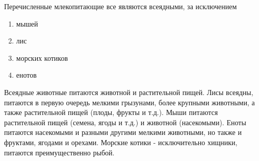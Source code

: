 
Перечисленные млекопитающие все являются всеядными, за исключением

\begin{enumerate}
    \item мышей
    \item лис
    \item морских котиков
    \item енотов
\end{enumerate}

\explanationSection

Всеядные животные питаются животной и растительной пищей. Лисы всеядны, питаются в первую очередь мелкими грызунами, более крупными животными, а также растительной пищей (плоды, фрукты и т.д.).  
Мыши питаются растительной пищей (семена, ягоды и т.д.) и животной (насекомыми). Еноты питаются насекомыми и разными другими мелкими животными, 
но также и фруктами, ягодами и орехами. Морские котики - исключительно хищники, питаются преимущественно рыбой.

